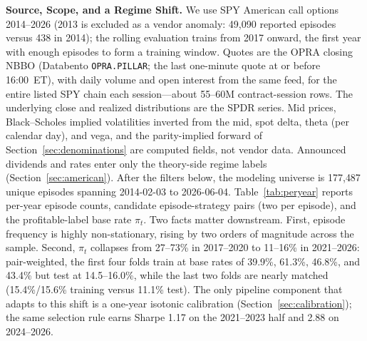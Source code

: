 \documentclass[sigconf,review]{acmart}
\begin{document}
\medskip\noindent\textbf{Source, Scope, and a Regime Shift.}
\label{sec:data-source}
We use SPY American call options 2014--2026 (2013 is excluded as a vendor anomaly: 49{,}090 reported episodes versus 438 in 2014); the rolling evaluation trains from 2017 onward, the first year with enough episodes to form a training window. Quotes are the OPRA closing NBBO (Databento \texttt{OPRA.PILLAR}; the last one-minute quote at or before 16:00~ET), with daily volume and open interest from the same feed, for the entire listed SPY chain each session---about 55--60M contract-session rows. The underlying close and realized distributions are the SPDR series. Mid prices, Black--Scholes implied volatilities inverted from the mid, spot delta, theta (per calendar day), and vega, and the parity-implied forward of Section~\ref{sec:denominations} are computed fields, not vendor data. Announced dividends and rates enter only the theory-side regime labels (Section~\ref{sec:american}). After the filters below, the modeling universe is 177{,}487 unique episodes spanning 2014-02-03 to 2026-06-04. Table~\ref{tab:peryear} reports per-year episode counts, candidate episode-strategy pairs (two per episode), and the profitable-label base rate $\pi_t$. Two facts matter downstream. First, episode frequency is highly non-stationary, rising by two orders of magnitude across the sample. Second, $\pi_t$ collapses from 27--73\% in 2017--2020 to 11--16\% in 2021--2026: pair-weighted, the first four folds train at base rates of 39.9\%, 61.3\%, 46.8\%, and 43.4\% but test at 14.5--16.0\%, while the last two folds are nearly matched (15.4\%/15.6\% training versus 11.1\% test). The only pipeline component that adapts to this shift is a one-year isotonic calibration (Section~\ref{sec:calibration}); the same selection rule earns Sharpe 1.17 on the 2021--2023 half and 2.88 on 2024--2026.
\end{document}
